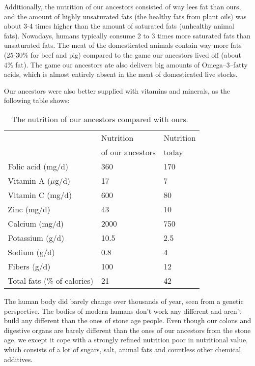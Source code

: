 \documentclass[../main.tex]{subfiles}
\begin{document}
Additionally, the nutrition of our ancestors consisted of way lees fat than ours, and the amount of
highly unsaturated fats (the healthy fats from plant oils) was about 3-4 times higher
than the amount of saturated fats
(unhealthy animal fats).
Nowadays, humans typically consume 2 to 3 times more saturated fats than unsaturated fats.
The meat of the domesticated animals contain way more fats (25-30\% for beef and pig)
compared to the game our ancestors lived off (about 4\% fat).
The game our ancestors ate also delivers big amounts of Omega--3--fatty acids,
which is almost entirely absent in the meat of domesticated live stocks.

Our ancestors  were also better supplied with vitamins and minerals, as the following table shows:

\begin{table}[htb]
  \centering
  \begin{tabular}{l|l|l}
    & Nutrition & Nutrition \\
    & of our ancestors & today \\
    \hline
    Folic acid (mg/d) & 360 & 170 \\
    Vitamin A  ($\mu$g/d) & 17 & 7 \\
    Vitamin C (mg/d) & 600 & 80\\
    Zinc (mg/d) & 43 & 10 \\
    Calcium (mg/d) & 2000 & 750 \\
    Potassium (g/d) & 10.5 & 2.5 \\
    Sodium (g/d) & 0.8 & 4 \\
    Fibers (g/d) & 100 & 12 \\
    Total fats (\% of calories) & 21 & 42 \\
    \hline
  \end{tabular}
  \caption[Nutrition of our ancestors.]{The nutrition of our ancestors compared with ours.~\cite{EatonAl}}
\end{table}

The human body did barely change over thousands of year, seen from a genetic perspective.
The bodies of modern humans don't work any different and aren't build any different than the ones of stone age people.
Even though our colons and digestive organs are barely different than the ones of our ancestors from the stone age,
we except it cope with a strongly refined nutrition poor in nutritional value, which consists of a lot of sugars, salt,
animal fats and countless other chemical additives.
\end{document}
